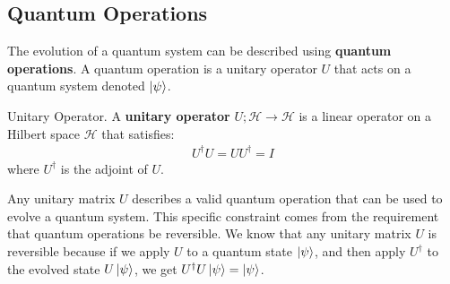 \subsection{Quantum Operations}

The evolution of a quantum system can be described using \textbf{quantum operations}. A quantum operation is a unitary operator $U$ that acts on a quantum system denoted $\ket{\psi}$.

\begin{definition}{Unitary Operator.}
    A \textbf{unitary operator} $U;\mathcal{H} \to \mathcal{H}$ is a linear operator on a Hilbert space $\mathcal{H}$ that satisfies:
    \begin{align}
        U^{\dagger}U = UU^{\dagger} = I
    \end{align}
    where $U^{\dagger}$ is the adjoint of $U$.
\end{definition}
Any unitary matrix $U$ describes a valid quantum operation that can be used to evolve a quantum system. This specific constraint comes from the requirement that quantum operations be reversible. We know that any unitary matrix $U$ is reversible because if we apply $U$ to a quantum state $\ket{\psi}$, and then apply $U^{\dagger}$ to the evolved state $U\ket{\psi}$, we get $U^{\dagger}U\ket{\psi} = \ket{\psi}$.

